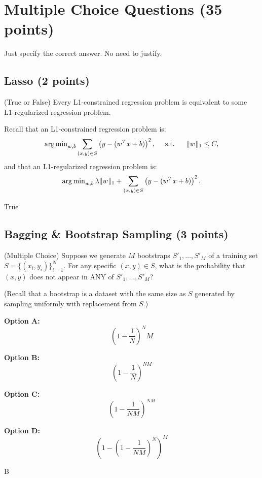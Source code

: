 \section{Multiple Choice Questions (35 points) }

Just specify the correct answer.  No need to justify.

\subsection{Lasso (2 points)}

\question (True or False) Every L1-constrained regression problem is equivalent to some L1-regularized regression problem.

Recall that an L1-constrained regression problem is:
$$\operatorname{arg\,min}_{w,b} \sum_{(x,y)\in S} \left(y - (w^Tx + b)\right)^2,\ \ \ \      \mbox{s.t.}\ \ \ \ \ \|w\|_1 \leq C,
$$
and that an L1-regularized regression problem is:
$$\operatorname{arg\,min}_{w,b} \lambda\|w\|_1 + \sum_{(x,y)\in S} \left(y - (w^Tx + b)\right)^2.$$

\vspace{-0.2in}
\begin{solution}
True
\end{solution}


\subsection{Bagging \& Bootstrap Sampling (3 points)}

\question
(Multiple Choice) Suppose we generate $M$ bootstraps $S'_1,\ldots,S'_M$ of a training set $S=\{(x_i,y_i)\}_{i=1}^N$.  For any specific $(x,y) \in S$, what is the probability that $(x,y)$ does not appear in ANY of $S'_1,\ldots,S'_M$?

(Recall that a bootstrap is a dataset with the same size as $S$ generated by sampling uniformly with replacement from $S$.)

\textbf{Option A:}
$$
\left(1-\frac{1}{N}\right)^NM
$$

\textbf{Option B:}
$$
\left(1-\frac{1}{N}\right)^{NM}
$$

\textbf{Option C:}
$$
\left(1-\frac{1}{NM}\right)^{NM}
$$

\textbf{Option D:}
$$
\left(1-\left(1-\frac{1}{NM}\right)^N\right)^M
$$

\vspace{-0.2in}
\begin{solution}
B
\end{solution}


